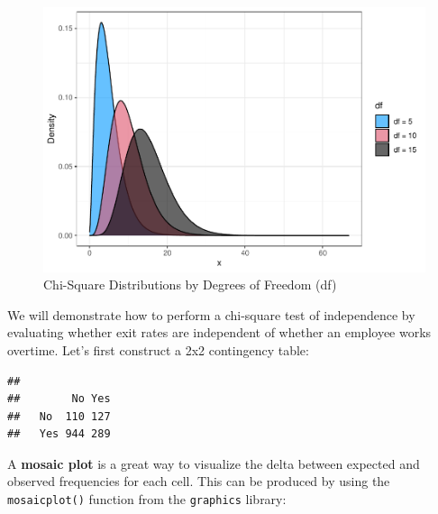 \documentclass[]{book}
\newenvironment{Shaded}{\begin{snugshade}}{\end{snugshade}}
\newcommand{\CommentTok}[1]{\textcolor[rgb]{0.56,0.35,0.01}{\textit{#1}}}
\newcommand{\KeywordTok}[1]{\textcolor[rgb]{0.13,0.29,0.53}{\textbf{#1}}}
\newcommand{\NormalTok}[1]{#1}
\newcommand{\OperatorTok}[1]{\textcolor[rgb]{0.81,0.36,0.00}{\textbf{#1}}}
\newcommand{\StringTok}[1]{\textcolor[rgb]{0.31,0.60,0.02}{#1}}
\begin{document}
\begin{figure}

{\centering \includegraphics[width=1\linewidth]{People_Analytics_Lifecycle_files/figure-latex/chisq-dist-1} 

}

\caption{Chi-Square Distributions by Degrees of Freedom (df)}\label{fig:chisq-dist}
\end{figure}

We will demonstrate how to perform a chi-square test of independence by evaluating whether exit rates are independent of whether an employee works overtime. Let's first construct a 2x2 contingency table:

\begin{Shaded}
\end{Shaded}

\begin{verbatim}
##      
##        No Yes
##   No  110 127
##   Yes 944 289
\end{verbatim}

A \textbf{mosaic plot} is a great way to visualize the delta between expected and observed frequencies for each cell. This can be produced by using the \texttt{mosaicplot()} function from the \texttt{graphics} library:
\end{document}
